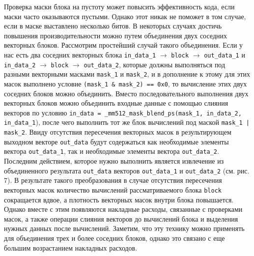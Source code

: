 Проверка маски блока на пустоту может повысить эффективность кода, если маски часто оказываются пустыми.
Однако этот никак не поможет в том случае, если в маске выставлено несколько битов.
В некоторых случаях достичь повышения производительности можно путем объединения двух соседних векторных блоков.
Рассмотрим простейший случай такого объединения.
Если у нас есть два соседних векторных блока \texttt{in\_data\_1} $\rightarrow$ \texttt{block} $\rightarrow$ \texttt{out\_data\_1} и \texttt{in\_data\_2} $\rightarrow$ \texttt{block} $\rightarrow$ \texttt{out\_data\_2}, которые должны выполняться под разными векторными масками \texttt{mask\_1} и \texttt{mask\_2}, и в дополнение к этому для этих масок выполнено условие \texttt{(mask\_1 \& mask\_2) == 0x0}, то вычисление этих двух соседних блоков можно объединить.
Вместо последовательного выполнения двух векторных блоков можно объединить входные данные с помощью слияния векторов по условию \texttt{in\_data = \_mm512\_mask\_blend\_ps(mask\_1, in\_data\_2, in\_data\_1}), после чего выполнить тот же блок вычислений под маской \texttt{mask\_1 | mask\_2}.
Ввиду отсутствия пересечения векторных масок в результирующем выходном векторе \texttt{out\_data} будут содержаться как необходимые элементы вектора \texttt{out\_data\_1}, так и необходимые элементы вектора \texttt{out\_data\_2}.
Последним действием, которое нужно выполнить является извлечение из объединенного результата \texttt{out\_data} векторов \texttt{out\_data\_1} и \texttt{out\_data\_2} (см. рис. 7).
В результате такого преобразования в случае отсутствия пересечения векторных масок количество вычислений рассматриваемого блока \texttt{block} сокращается вдвое, а плотность векторных масок внутри блока повышается.
Однако вместе с этим появляются накладные расходы, связанные с проверками масок, а также операции слияния векторов до вычислений блока и выделения нужных данных после вычислений.
Заметим, что эту технику можно применять для объединения трех и более соседних блоков, однако это связано с еще большим возрастанием накладных расходов.

